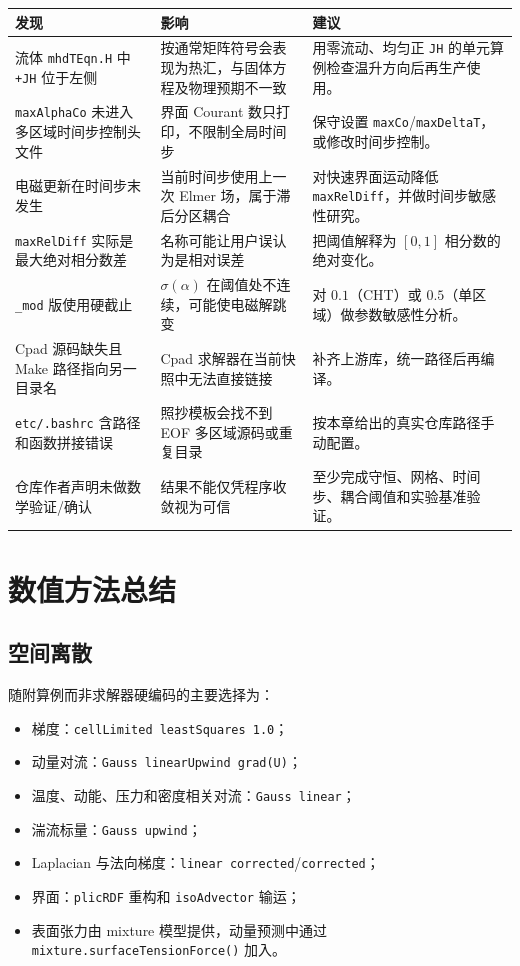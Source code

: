\documentclass[11pt,a4paper]{article}
\begin{document}
\begin{longtable}{@{}L{0.25\textwidth}L{0.37\textwidth}L{0.31\textwidth}@{}}
\toprule
\textbf{发现} & \textbf{影响} & \textbf{建议} \\
\midrule
\endhead
流体 \texttt{mhdTEqn.H} 中 \texttt{+JH} 位于左侧 &
按通常矩阵符号会表现为热汇，与固体方程及物理预期不一致 &
用零流动、均匀正 \texttt{JH} 的单元算例检查温升方向后再生产使用。\\
\texttt{maxAlphaCo} 未进入多区域时间步控制头文件 &
界面 Courant 数只打印，不限制全局时间步 &
保守设置 \texttt{maxCo}/\texttt{maxDeltaT}，或修改时间步控制。\\
电磁更新在时间步末发生 &
当前时间步使用上一次 Elmer 场，属于滞后分区耦合 &
对快速界面运动降低 \texttt{maxRelDiff}，并做时间步敏感性研究。\\
\texttt{maxRelDiff} 实际是最大绝对相分数差 &
名称可能让用户误认为是相对误差 &
把阈值解释为 $[0,1]$ 相分数的绝对变化。\\
\texttt{\_mod} 版使用硬截止 &
$\sigma(\alpha)$ 在阈值处不连续，可能使电磁解跳变 &
对 $0.1$（CHT）或 $0.5$（单区域）做参数敏感性分析。\\
Cpad 源码缺失且 Make 路径指向另一目录名 &
Cpad 求解器在当前快照中无法直接链接 &
补齐上游库，统一路径后再编译。\\
\texttt{etc/.bashrc} 含路径和函数拼接错误 &
照抄模板会找不到 EOF 多区域源码或重复目录 &
按本章给出的真实仓库路径手动配置。\\
仓库作者声明未做数学验证/确认 &
结果不能仅凭程序收敛视为可信 &
至少完成守恒、网格、时间步、耦合阈值和实验基准验证。\\
\bottomrule
\end{longtable}

\section{数值方法总结}

\subsection{空间离散}

随附算例而非求解器硬编码的主要选择为：
\begin{itemize}
    \item 梯度：\texttt{cellLimited leastSquares 1.0}；
    \item 动量对流：\texttt{Gauss linearUpwind grad(U)}；
    \item 温度、动能、压力和密度相关对流：\texttt{Gauss linear}；
    \item 湍流标量：\texttt{Gauss upwind}；
    \item Laplacian 与法向梯度：\texttt{linear corrected}/\texttt{corrected}；
    \item 界面：\texttt{plicRDF} 重构和 \texttt{isoAdvector} 输运；
    \item 表面张力由 mixture 模型提供，动量预测中通过
    \texttt{mixture.surfaceTensionForce()} 加入。
\end{itemize}
\end{document}
